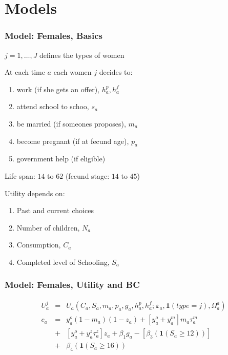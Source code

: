 \section{Models}
\begin{frame}
	\frametitle{Model: Females, Basics}
		\begin{wideitemize}
		\item $j = 1, \ldots, J$ defines the types of women
		\item At each time $a$ each women $j$ decides to:
		\begin{enumerate}
			\item work (if she gets an offer), $h_{a}^p,h_{a}^f$
			\item attend school to schoo, $s_{a}$
			\item be married (if someones proposes), $m_{a}$
			\item become pregnant (if at fecund age), $p_{a}$
			\item government help (if eligible)
		\end{enumerate}
		\item Life span: $14$ to $62$ (fecund stage: $14$ to $45$)
		\item Utility depends on:
			\begin{enumerate}
				\item Past and current choices
				\item Number of children, $N_{a}$
				\item Consumption, $C_{a}$
				\item Completed level of Schooling, $S_{a}$
			\end{enumerate}
		\end{wideitemize}
\end{frame}

\begin{frame}
	\frametitle{Model: Females, Utility and BC}
	\begin{eqnarray}
	U_{a}^j &=& U_{a} \left( C_{a}, S_{a}, m_{a}, p_{a}, g_{a}, h_{a}^p, h_{a}^f; \mathbf{\varepsilon}_{a}, \mathbf{1}(type=j), \Omega_{a}^a \right) \nonumber \\
c_{a} &=& y_{a}^o (1 - m_{a})(1 - z_{a}) + \left[ y_{a}^o + y_{a}^m\right]m_{a}\tau_{a}^m \nonumber \\
	                  &+& \left[ y_{a}^o + y_{a}^z \tau_{a}^z \right]z_{a} + \beta_{1}g_{a} - [\beta_{3}  \left( \mathbf{1}(S_{a} \geq 12) \right) ] \nonumber \\ 
	                 &+& \beta_{4} \left( \mathbf{1}(S_{a} \geq 16) \right) \nonumber
	\end{eqnarray}
	
\end{frame}


